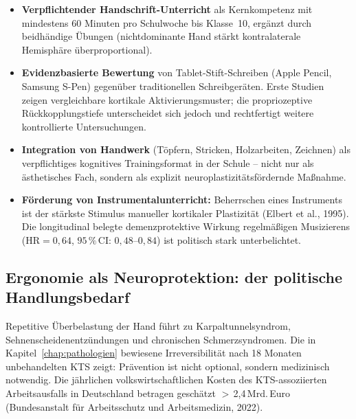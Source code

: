 ﻿\documentclass[12pt,a4paper]{report}
\theoremstyle{plain}
\theoremstyle{definition}
\theoremstyle{remark}
\begin{document}
\begin{itemize}
\item \textbf{Verpflichtender Handschrift-Unterricht} als Kernkompetenz
  mit mindestens 60 Minuten pro Schulwoche bis Klasse~10, ergänzt
  durch beidhändige Übungen (nichtdominante Hand stärkt kontralaterale
  Hemisphäre überproportional).
\item \textbf{Evidenzbasierte Bewertung} von Tablet-Stift-Schreiben
  (Apple Pencil, Samsung S-Pen) gegenüber traditionellen Schreibgeräten.
  Erste Studien zeigen vergleichbare kortikale Aktivierungsmuster;
  die propriozeptive Rückkopplungstiefe unterscheidet sich jedoch und
  rechtfertigt weitere kontrollierte Untersuchungen.
\item \textbf{Integration von Handwerk} (Töpfern, Stricken, Holzarbeiten,
  Zeichnen) als verpflichtiges kognitives Trainingsformat in der Schule --
  nicht nur als ästhetisches Fach, sondern als explizit
  neuroplastizitätsfördernde Maßnahme.
\item \textbf{Förderung von Instrumentalunterricht:} Beherrschen eines
  Instruments ist der stärkste Stimulus manueller kortikaler Plastizität
  (Elbert et al., 1995). Die longitudinal belegte demenzprotektive
  Wirkung regelmäßigen Musizierens ($\text{HR} = 0{,}64$,
  $95\,\%$\,CI: $0{,}48$--$0{,}84$) ist politisch stark unterbelichtet.
\end{itemize}

\subsection{Ergonomie als Neuroprotektion: der politische Handlungsbedarf}

Repetitive Überbelastung der Hand führt zu Karpaltunnelsyndrom,
Sehnenscheidenentzündungen und chronischen Schmerzsyndromen. Die in
Kapitel~\ref{chap:pathologien} bewiesene Irreversibilität nach 18 Monaten
unbehandelten KTS zeigt: Prävention ist nicht optional, sondern medizinisch
notwendig. Die jährlichen volkswirtschaftlichen Kosten des KTS-assoziierten
Arbeitsausfalls in Deutschland betragen geschätzt $>$\,2,4\,Mrd.\,Euro
(Bundesanstalt für Arbeitsschutz und Arbeitsmedizin, 2022).
\end{document}

